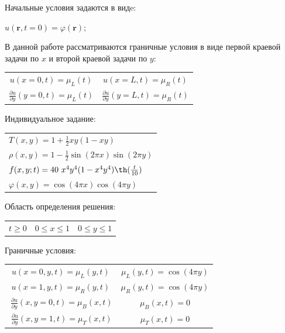 \documentclass[a4paper,12pt]{article}
\begin{document}
Начальные условия задаются в видe:
\begin{center}
	$u(\textbf{r}, t = 0) = \varphi (\textbf{r});$
\end{center}
В данной работе рассматриваются граничные условия в виде первой краевой задачи по $x$ и второй краевой задачи по $y$:
\begin{center}
	\begin{tabular}{c c}
		$u(x = 0, t) = \mu_L (t)$&$ u(x = L, t) = \mu_R (t)$ \\
		$\displaystyle \frac{\partial u }{\partial y}(y = 0, t) = \mu_L (t)$&$\displaystyle \frac{\partial u }{\partial y} (y = L, t) = \mu_R (t)$
	\end{tabular}
\end{center}

\newpage
Индивидуальное задание:
\begin{center}
	\begin{tabular}{l}
		$T (x, y) = 1 + \frac{1}{2} xy(1 - xy)$\\
		$\rho(x, y) = 1 - \frac{1}{2} \sin(2 \pi x) \sin(2 \pi y)$ \\
		$f( x, y; t) = 40\ x^4 y^4 (1 - x^4 y^4) \th(\frac{t}{10})$\\
		$\varphi( x, y) =  \cos(4\pi x) \cos(4 \pi y) $
	\end{tabular}
\end{center}

Область определения решения:
\begin{center}
	\begin{tabular}{c c c }
		$	t \geq 0 $&
		$	0 \leq x \leq 1 $&
		$	0 \leq y \leq 1$
	\end{tabular}
\end{center}
Граничные условия:
\begin{center}
	\begin{tabular}{c c }
		$u(x = 0, y, t) = \mu_L (y, t)$& $\mu_L (y, t) = \cos(4\pi y)$\\
		$u(x = 1, y, t) = \mu_R (y, t)$& $\mu_R (y, t) = \cos(4\pi y)$\\
		$\  \frac{\partial u }{\partial y} (x, y = 0, t) = \mu_B (x, t)$ &$\mu_B (x, t) = 0$\\
		$\  \frac{\partial u }{\partial y} (x, y = 1, t) = \mu_T (x, t)$ &$\mu_T (x, t) = 0$\\
	\end{tabular}
\end{center}
\end{document}

